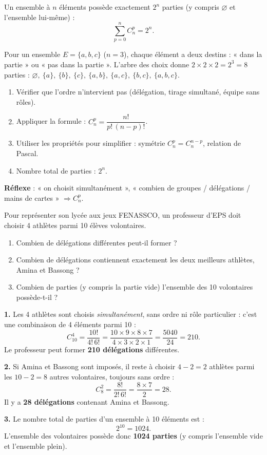 \documentclass[11pt]{article}
\newcommand{\cle}[1]{{\popxbold\color{popdark}#1}}
\begin{document}
\begin{propriete}
Un ensemble à $n$ éléments possède exactement $2^n$ parties (y compris $\varnothing$ et l'ensemble lui-même) :
\[ \sum_{p=0}^{n}C_n^p=2^n. \]
\end{propriete}

\begin{experience}
Pour un ensemble $E=\{a,b,c\}$ ($n=3$), chaque élément a deux destins : « dans la partie » ou « pas dans la partie ». L'arbre des choix donne $2\times2\times2=2^3=8$ parties :
$\varnothing,\ \{a\},\ \{b\},\ \{c\},\ \{a,b\},\ \{a,c\},\ \{b,c\},\ \{a,b,c\}$.
\end{experience}

\begin{methode}
\begin{enumerate}
\item \cle{Vérifier} que l'ordre n'intervient pas (délégation, tirage simultané, équipe sans rôles).
\item \cle{Appliquer la formule} : $C_n^p=\dfrac{n!}{p!\,(n-p)!}$.
\item \cle{Utiliser les propriétés} pour simplifier : symétrie $C_n^p=C_n^{n-p}$, relation de Pascal.
\item \cle{Nombre total de parties} : $2^n$.
\end{enumerate}
\textbf{Réflexe} : « on choisit simultanément », « combien de groupes / délégations / mains de cartes » $\Rightarrow C_n^p$.
\end{methode}

\begin{exoresolu}
Pour représenter son lycée aux jeux FENASSCO, un professeur d'EPS doit choisir 4 athlètes parmi 10 élèves volontaires.
\begin{enumerate}
\item Combien de délégations différentes peut-il former ?
\item Combien de délégations contiennent exactement les deux meilleurs athlètes, Amina et Bassong ?
\item Combien de parties (y compris la partie vide) l'ensemble des 10 volontaires possède-t-il ?
\end{enumerate}
\tcblower
\textbf{1.} Les 4 athlètes sont choisis \emph{simultanément}, sans ordre ni rôle particulier : c'est une combinaison de 4 éléments parmi 10 :
\[ C_{10}^4=\frac{10!}{4!\,6!}=\frac{10\times 9\times 8\times 7}{4\times 3\times 2\times 1}=\frac{\num{5040}}{24}=210. \]
Le professeur peut former \textbf{210 délégations} différentes.

\textbf{2.} Si Amina et Bassong sont imposés, il reste à choisir $4-2=2$ athlètes parmi les $10-2=8$ autres volontaires, toujours sans ordre :
\[ C_8^2=\frac{8!}{2!\,6!}=\frac{8\times 7}{2}=28. \]
Il y a \textbf{28 délégations} contenant Amina et Bassong.

\textbf{3.} Le nombre total de parties d'un ensemble à 10 éléments est :
\[ 2^{10}=\num{1024}. \]
L'ensemble des volontaires possède donc \textbf{\num{1024} parties} (y compris l'ensemble vide et l'ensemble plein).
\end{exoresolu}
\end{document}
